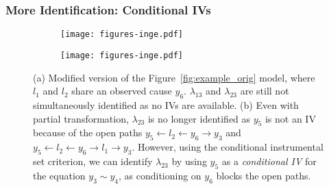 \documentclass{beamer}
\begin{document}
\begin{frame}
	\frametitle{More Identification: Conditional IVs}
	\begin{figure}[t]
		\centering
		\begin{subfigure}[b]{0.5 \linewidth}
			\centering
			\texttt{[image: figures-inge.pdf]}
			\caption{}
			\label{fig:example_conditional_iv}
		\end{subfigure}%
		\begin{subfigure}[b]{0.5 \linewidth}
			\centering
			\texttt{[image: figures-inge.pdf]}
			\caption{}
			\label{fig:transform_conditional_iv}
		\end{subfigure}
		\caption{(a) Modified version of the Figure~\ref{fig:example_orig} model, where $l_1$ and $l_2$
			share an observed cause $y_6$.
			$\lambda_{13} $ and $ \lambda_{23} $ are still not
			simultaneously identified as no IVs are available. (b) Even
			with partial transformation, $ \lambda_{23} $ is no longer
			identified as $ y_5 $ is not an IV because of the open paths $
			y_5 \gets l_2 \gets y_6 \to y_3 $ and $ y_5 \gets l_2 \gets y_6
			\to l_1 \to y_3 $. However, using the conditional instrumental
			set criterion, we can identify $\lambda_{23}$ by using $y_5$ as
			a \emph{conditional IV} for the equation $y_3 \sim y_4$, as
			conditioning on $ y_6 $ blocks the open paths.}
	\label{fig:examples4}
	\end{figure}
\end{frame}
\end{document}
